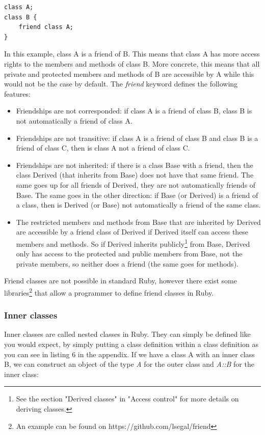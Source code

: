 \documentclass[10pt,a4paper,twocolumn]{article}
\begin{document}
\begin{lstlisting}
class A;
class B {
	friend class A;
}
\end{lstlisting}

In this example, class A is a friend of B. This means that class A has more access rights to the members and methods of class B. More concrete, this means that all private and protected members and methods of B are accessible by A while this would not be the case by default. The \textit{friend} keyword defines the following features:

\begin{itemize}
\item Friendships are not corresponded: if class A is a friend of class B, class B is not automatically a friend of class A.
\item Friendships are not transitive: if class A is a friend of class B and class B is a friend of class C, then is class A not a friend of class C.
\item Friendships are not inherited: if there is a class Base with a friend, then the class Derived (that inherits from Base) does not have that same friend. The same goes up for all friends of Derived, they are not automatically friends of Base. The same goes in the other direction: if Base (or Derived) is a friend of a class, then is Derived (or Base) not automatically a friend of the same class.
\item The restricted members and methods from Base that are inherited by Derived are accessible by a friend class of Derived if Derived itself can access these members and methods. So if Derived inherits publicly\footnote{See the section "Derived classes" in "Access control" for more details on deriving classes.} from Base, Derived only has access to the protected and public members from Base, not the private members, so neither does a friend (the same goes for methods).
\end{itemize}

Friend classes are not possible in standard Ruby, however there exist some libraries\footnote{An example can be found on https://github.com/lsegal/friend} that allow a programmer to define friend classes in Ruby.

\subsubsection{Inner classes}
Inner classes are called nested classes in Ruby. They can simply be defined like you would expect, by simply putting a class definition within a class definition as you can see in listing 6 in the appendix. If we have a class A with an inner class B, we can construct an object of the type \textit{A} for the outer class and \textit{A::B} for the inner class:
\end{document}
